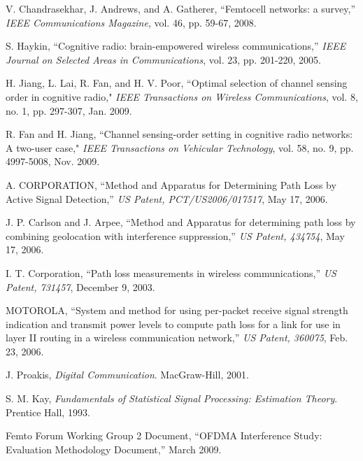 \documentclass[conference]{IEEEtran}
\begin{document}
\begin{thebibliography}{1}
V. Chandrasekhar, J. Andrews, and A. Gatherer, ``Femtocell networks:
a survey,'' \emph{IEEE Communications Magazine}, vol. 46, pp. 59-67,
2008.

S. Haykin, ``Cognitive radio: brain-empowered wireless
communications,'' \emph{IEEE Journal on Selected Areas in
Communications}, vol. 23, pp. 201-220, 2005.

H. Jiang, L. Lai, R. Fan, and H. V. Poor, ``Optimal selection of channel sensing order in cognitive radio," {\it IEEE Transactions on
Wireless Communications}, vol. 8, no. 1, pp. 297-307, Jan. 2009.

R. Fan and H. Jiang, ``Channel sensing-order setting in cognitive radio networks: A two-user case," {\it IEEE Transactions on
Vehicular Technology}, vol. 58, no. 9, pp. 4997-5008, Nov. 2009.


A. CORPORATION, ``Method and Apparatus for Determining Path Loss by
Active Signal Detection,'' \emph{US Patent, PCT/US2006/017517}, May
17, 2006.

J. P. Carlson and J. Arpee, ``Method and Apparatus for determining
path loss by combining geolocation with interference suppression,''
\emph{US Patent, 434754}, May 17, 2006.

I. T. Corporation, ``Path loss measurements in wireless
communications,'' \emph{US Patent, 731457}, December 9, 2003.

MOTOROLA, ``System and method for using per-packet receive signal
strength indication and transmit power levels to compute path loss
for a link for use in layer II routing in a wireless communication
network,'' \emph{US Patent, 360075}, Feb. 23, 2006.

J. Proakis, \emph{Digital Communication}. MacGraw-Hill, 2001.

S. M. Kay, \emph{Fundamentals of Statistical Signal Processing:
Estimation Theory}. Prentice Hall, 1993.

Femto Forum Working Group 2 Document, ``OFDMA Interference Study:
Evaluation Methodology Document,'' March 2009.





\end{thebibliography}
\end{document}
